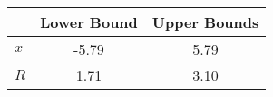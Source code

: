 \begin{tiny}\begin{tabular}{|l|c|c|}
\hline
&\textbf{Lower Bound}&\textbf{Upper Bounds}\\\hline
\textbf{$x$}&-5.79&5.79\\\hline
\textbf{$R$}&1.71&3.10\\\hline
\end{tabular}
\end{tiny}
